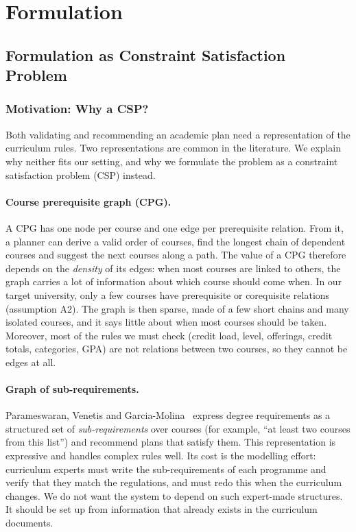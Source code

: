 \documentclass[10pt,a4paper]{article}
\begin{document}
\section{Formulation} \label{sec:formulation}

    \subsection{Formulation as Constraint Satisfaction Problem}

      \subsubsection{Motivation: Why a CSP?}\label{sec:motivation}
Both validating and recommending an academic plan need a representation of the curriculum rules. Two representations are common in the literature. We explain why neither fits our setting, and why we formulate the problem as a constraint satisfaction problem (CSP) instead.

\paragraph{Course prerequisite graph (CPG).}
A CPG has one node per course and one edge per prerequisite relation. From it, a planner can derive a valid order of courses, find the longest chain of dependent courses and suggest the next courses along a path. The value of a CPG therefore depends on the \emph{density} of its edges: when most courses are linked to others, the graph carries a lot of information about which course should come when. In our target university, only a few courses have prerequisite or
corequisite relations (assumption A2). The graph is then sparse, made of a few short chains and many isolated courses, and it says little about when most courses should be taken. Moreover, most of the rules we must check (credit load, level, offerings, credit totals, categories, GPA) are not
relations between two courses, so they cannot be edges at all.

\paragraph{Graph of sub-requirements.}
Parameswaran, Venetis and Garcia-Molina~\cite{parameswaran2011recommendation} express degree requirements as a structured set of \emph{sub-requirements} over courses (for example, ``at least two courses from this list'') and recommend plans that satisfy them. This representation is expressive and handles complex rules well. Its cost is the modelling effort: curriculum experts must write the sub-requirements of each programme and verify that they match the regulations, and must redo this when the curriculum changes. We do not want the system to depend on such expert-made structures. It should be set up from information that already exists in the curriculum documents.
\end{document}

